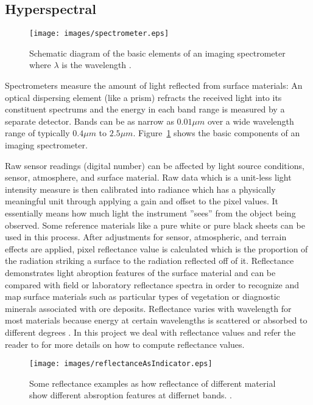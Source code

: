 \subsection{Hyperspectral}

\begin{figure}[b!]
  \centering
    \texttt{[image: images/spectrometer.eps]}
    \caption[Imaging spectrometer schematic diagram]{Schematic diagram of the basic elements of an imaging spectrometer where $\lambda$ is the wavelength \citep{smith2006introduction}.}
    \label{fig:Imaging spectrometer}
\end{figure}

Spectrometers measure the amount of light reflected from surface materials: An optical dispersing element (like a prism) refracts the received light into its constituent spectrums and the energy in each band range is measured by a separate detector. Bands can be as narrow as $0.01 \mu m$ over a wide wavelength range of typically $0.4 \mu m$ to $2.5 \mu m$. Figure~\ref{fig:Imaging spectrometer} shows the basic components of an imaging spectrometer.

Raw sensor readings (digital number) can be affected by light source conditions, sensor, atmosphere, and surface material. Raw data which is a unit-less light intensity measure is then calibrated into radiance which has a  physically meaningful unit through applying a gain and offset to the pixel values. It essentially means how much light the instrument ''sees'' from the object being observed. Some reference materials like a pure white or pure black sheets can be used in this process. After adjustments for sensor, atmospheric, and terrain effects are applied, pixel reflectance value is calculated which is the proportion of the radiation striking a surface to the radiation reflected off of it. Reflectance demonstrates light abroption features of the surface material and can be compared with field or laboratory reflectance spectra in order to recognize and map surface materials such as particular types of vegetation or diagnostic minerals associated with ore deposits. Reflectance varies with wavelength for most materials because energy at certain wavelengths is scattered or absorbed to different degrees \citep{smith2006introduction}. In this project we deal with reflectance values and refer the reader to \citep{varshney2004advanced} for more details on how to compute reflectance values.


\begin{figure}[t!]
  \centering
    \texttt{[image: images/reflectanceAsIndicator.eps]}
    \caption[Some reflectance examples]{Some reflectance examples as how reflectance of different material show different absroption features at differnet bands. \citep{smith2006introduction}.}
    \label{fig:Some reflectance examples}
\end{figure}

